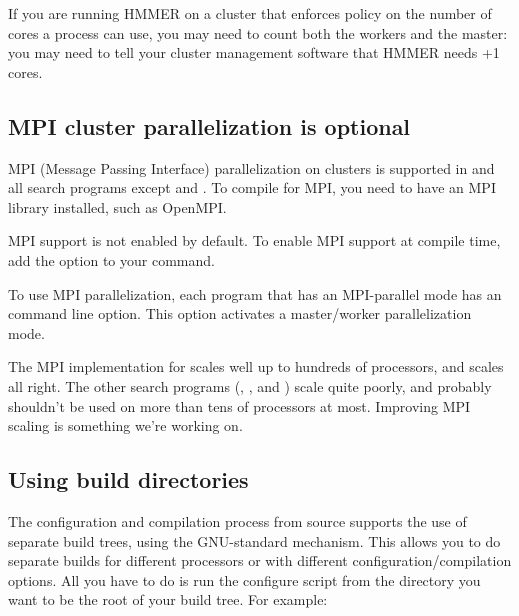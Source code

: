 If you are running HMMER on a cluster that enforces policy on the
number of cores a process can use, you may need to count both the
workers and the master: you may need to tell your cluster management
software that HMMER needs +1 cores.


\subsection{MPI cluster parallelization is optional}

MPI (Message Passing Interface) parallelization on clusters is
supported in  and all search programs except  and
. To compile for MPI, you need to have an MPI library
installed, such as OpenMPI.

MPI support is not enabled by default.  To enable MPI support at
compile time, add the  option to your
 command.

To use MPI parallelization, each program that has an MPI-parallel mode
has an  command line option. This option activates a
master/worker parallelization mode.

The MPI implementation for  scales well up to hundreds
of processors, and  scales all right. The other search
programs (, , and ) scale
quite poorly, and probably shouldn't be used on more than tens of
processors at most. Improving MPI scaling is something we're working on.


\subsection{Using build directories}

The configuration and compilation process from source supports the use
of separate build trees, using the GNU-standard 
mechanism. This allows you to do separate builds for different
processors or with different configuration/compilation options. All
you have to do is run the configure script from the directory you want
to be the root of your build tree.  For example:

  \vspace{1ex}
  \\
  \\
  \\
  \vspace{1ex}

